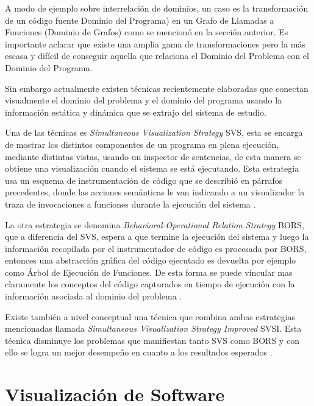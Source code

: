 \documentclass[a4paper,12pt]{report}
\begin{document}
A modo de ejemplo sobre interrelación de dominios, un caso es la transformación de un código fuente Dominio del Programa) en un Grafo de Llamadas a Funciones (Dominio de Grafos) como se mencionó en la sección anterior. Es importante aclarar que existe una amplia gama de transformaciones pero la más escasa y difícil de conseguir aquella que relaciona el Dominio del Problema con el Dominio del Programa.

Sin embargo actualmente existen técnicas recientemente elaboradas que conectan visualmente el dominio del problema y el dominio del programa usando la información estática y dinámica que se extrajo del sistema de estudio.

Una de las técnicas es \textit{Simultaneous Visualization Strategy} SVS, esta se encarga de mostrar los distintos componentes de un programa en plena ejecución, mediante distintas vistas, usando un inspector de sentencias, de esta manera se obtiene una visualización cuando el sistema se está ejecutando. Esta estrategia usa un esquema de instrumentación de código que se describió en párrafos precedentes, donde las acciones semánticas le van indicando a un visualizador la traza de invocaciones a funciones durante la ejecución del sistema \cite{BRM10,MPMR07}.

La otra estrategia se denomina \textit{Behavioral-Operational Relation Strategy} BORS, que a diferencia del SVS, espera a que termine la ejecución del sistema y luego la información recopilada por el instrumentador de código es procesada por BORS, entonces una abstracción gráfica del código ejecutado es devuelta por ejemplo como Árbol de Ejecución de Funciones. De esta forma se puede vincular mas claramente los conceptos del código capturados en tiempo de ejecución con la información asociada al dominio del problema \cite{BRM10,MPMR07}.

Existe también a nivel conceptual una técnica que combina ambas estrategias mencionadas llamada \textit{Simultaneous Visualization Strategy Improved} SVSI. Esta técnica disminuye los problemas que manifiestan tanto SVS como BORS y con ello se logra un mejor desempeño en cuanto a los resultados esperados \cite{BRM10,MPMR07}.

\section{Visualización de Software}
\end{document}
